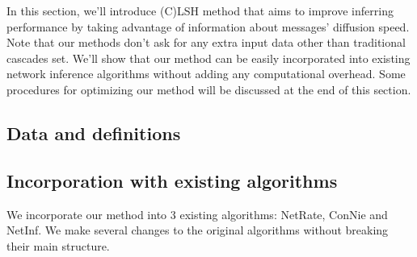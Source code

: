 In this section, we'll introduce (C)LSH method that aims to improve inferring performance by taking advantage of information about messages' diffusion speed. Note that our methods don't ask for any extra input data other than traditional cascades set. We'll show that our method can be easily incorporated into existing network inference algorithms without adding any computational overhead. Some procedures for optimizing our method will be discussed at the end of this section.
\subsection{Data and definitions}
\subsection{Incorporation with existing algorithms}
We incorporate our method into 3 existing algorithms: NetRate, ConNie and NetInf. We make several changes to the original algorithms without breaking their main structure.
